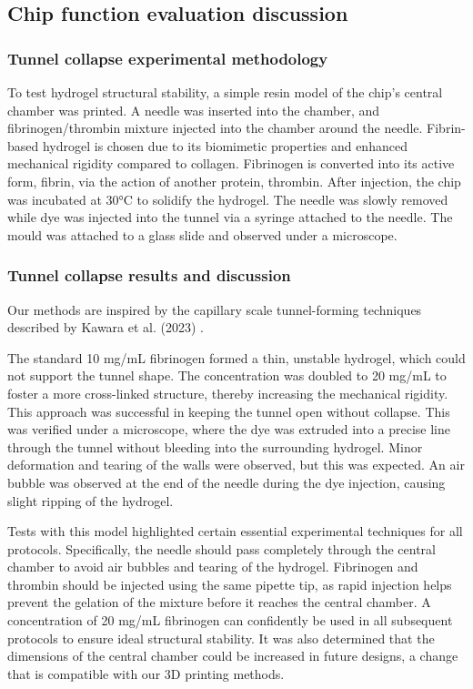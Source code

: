 \documentclass[letterpaper,12pt]{article}
\begin{document}
\subsection{Chip function evaluation discussion}





\subsubsection{Tunnel collapse experimental methodology}
To test hydrogel structural stability, a simple resin model of the chip’s central chamber was printed. A needle was inserted into the chamber, and fibrinogen/thrombin mixture injected into the chamber around the needle. Fibrin-based hydrogel is chosen due to its biomimetic properties and enhanced mechanical rigidity compared to collagen\parencite{oconnor_2022_engineering}. Fibrinogen is converted into its active form, fibrin, via the action of another protein, thrombin. After injection, the chip was incubated at 30°C to solidify the hydrogel. The needle was slowly removed while dye was injected into the tunnel via a syringe attached to the needle. The mould was attached to a glass slide and observed under a microscope. 


\subsubsection{Tunnel collapse results and discussion}

Our methods are inspired by the capillary scale tunnel-forming techniques described by Kawara et al. (2023) \parencite{Kawara2023}.

The standard 10 mg/mL fibrinogen formed a thin, unstable hydrogel, which could not support the tunnel shape\parencite{dibble_2023_the,tu_2022_a,yang_2020_optimization}. The concentration was doubled to 20 mg/mL to foster a more cross-linked structure, thereby increasing the mechanical rigidity. This approach was successful in keeping the tunnel open without collapse. This was verified under a microscope, where the dye was extruded into a precise line through the tunnel without bleeding into the surrounding hydrogel. Minor deformation and tearing of the walls were observed, but this was expected. An air bubble was observed at the end of the needle during the dye injection, causing slight ripping of the hydrogel.

Tests with this model highlighted certain essential experimental techniques for all protocols. Specifically, the needle should pass completely through the central chamber to avoid air bubbles and tearing of the hydrogel. Fibrinogen and thrombin should be injected using the same pipette tip, as rapid injection helps prevent the gelation of the mixture before it reaches the central chamber. A concentration of 20 mg/mL fibrinogen can confidently be used in all subsequent protocols to ensure ideal structural stability. It was also determined that the dimensions of the central chamber could be increased in future designs, a change that is compatible with our 3D printing methods.
\end{document}
